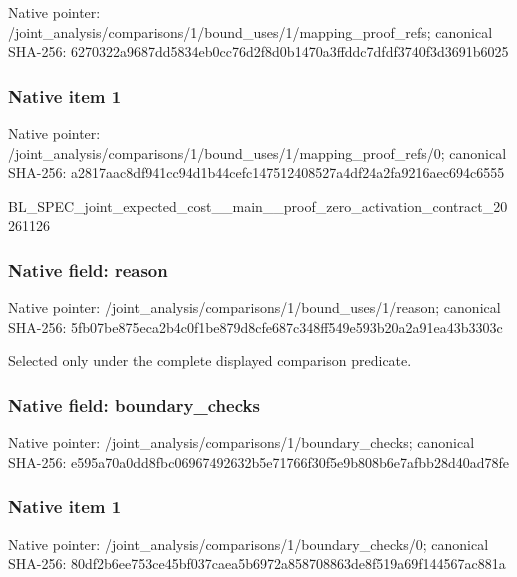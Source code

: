 \documentclass[10pt,a4paper]{article}
\begin{document}
Native pointer: /joint\_analysis/comparis\allowbreak{}ons/1/bound\_uses/1/mappi\allowbreak{}ng\_proof\_refs; canonical SHA-256: 6270322a9687dd5834eb0cc7\allowbreak{}6d2f8d0b1470a3ffddc7dfdf\allowbreak{}3740f3d3691b6025



\subsubsection{Native item 1}


Native pointer: /joint\_analysis/comparis\allowbreak{}ons/1/bound\_uses/1/mappi\allowbreak{}ng\_proof\_refs/0; canonical SHA-256: a2817aac8df941cc94d1b44c\allowbreak{}efc147512408527a4df24a2f\allowbreak{}a9216aec694c6555


BL\_SPEC\_joint\_expected\_c\allowbreak{}ost\_\_main\_\_proof\_zero\_ac\allowbreak{}tivation\_contract\_202611\allowbreak{}26


\subsubsection{Native field: reason}


Native pointer: /joint\_analysis/comparis\allowbreak{}ons/1/bound\_uses/1/reaso\allowbreak{}n; canonical SHA-256: 5fb07be875eca2b4c0f1be87\allowbreak{}9d8cfe687c348ff549e593b2\allowbreak{}0a2a91ea43b3303c


Selected only under the complete displayed comparison predicate.


\subsubsection{Native field: boundary\_checks}


Native pointer: /joint\_analysis/comparis\allowbreak{}ons/1/boundary\_checks; canonical SHA-256: e595a70a0dd8fbc069674926\allowbreak{}32b5e71766f30f5e9b808b6e\allowbreak{}7afbb28d40ad78fe



\subsubsection{Native item 1}


Native pointer: /joint\_analysis/comparis\allowbreak{}ons/1/boundary\_checks/0; canonical SHA-256: 80df2b6ee753ce45bf037cae\allowbreak{}a5b6972a858708863de8f519\allowbreak{}a69f144567ac881a
\end{document}
